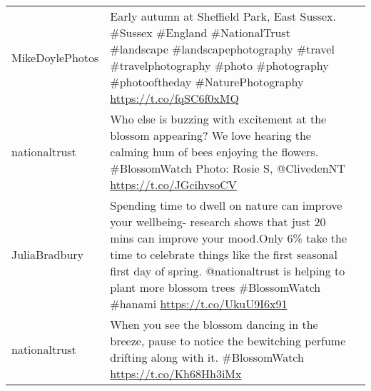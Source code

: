 \documentclass[
]{article}
\begin{document}
\begin{longtable}[]{@{}llr@{}}
\begin{minipage}[t]{0.22\columnwidth}\raggedright
MikeDoylePhotos\strut
\end{minipage} & \begin{minipage}[t]{0.49\columnwidth}\raggedright
Early autumn at Sheffield Park, East Sussex. \#Sussex \#England
\#NationalTrust \#landscape \#landscapephotography \#travel
\#travelphotography \#photo \#photography \#photooftheday
\#NaturePhotography \url{https://t.co/fqSC6f0xMQ}\strut
\end{minipage} & \begin{minipage}[t]{0.21\columnwidth}\raggedleft
543\strut
\end{minipage}\tabularnewline
\begin{minipage}[t]{0.22\columnwidth}\raggedright
nationaltrust\strut
\end{minipage} & \begin{minipage}[t]{0.49\columnwidth}\raggedright
Who else is buzzing with excitement at the blossom appearing? We love
hearing the calming hum of bees enjoying the flowers. \#BlossomWatch
Photo: Rosie S, @ClivedenNT \url{https://t.co/JGcihvsoCV}\strut
\end{minipage} & \begin{minipage}[t]{0.21\columnwidth}\raggedleft
536\strut
\end{minipage}\tabularnewline
\begin{minipage}[t]{0.22\columnwidth}\raggedright
JuliaBradbury\strut
\end{minipage} & \begin{minipage}[t]{0.49\columnwidth}\raggedright
Spending time to dwell on nature can improve your wellbeing- research
shows that just 20 mins can improve your mood.Only 6\% take the time to
celebrate things like the first seasonal first day of spring.
@nationaltrust is helping to plant more blossom trees \#BlossomWatch
\#hanami \url{https://t.co/UkuU9I6x91}\strut
\end{minipage} & \begin{minipage}[t]{0.21\columnwidth}\raggedleft
523\strut
\end{minipage}\tabularnewline
\begin{minipage}[t]{0.22\columnwidth}\raggedright
nationaltrust\strut
\end{minipage} & \begin{minipage}[t]{0.49\columnwidth}\raggedright
When you see the blossom dancing in the breeze, pause to notice the
bewitching perfume drifting along with it. \#BlossomWatch
\url{https://t.co/Kh68Hh3iMx}\strut
\end{minipage} & \begin{minipage}[t]{0.21\columnwidth}\raggedleft
455\strut
\end{minipage}\tabularnewline
\bottomrule
\end{longtable}
\end{document}
